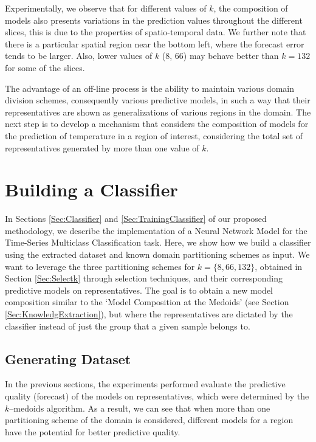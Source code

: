 Experimentally, we observe that for different values of $k$, the composition of models also presents variations in the prediction values throughout the different slices, this is due to the properties of spatio-temporal data. We further note that there is a particular spatial region near the bottom left, where the forecast error tends to be larger. Also, lower values of $k$ (8, 66) may behave better than $k=132$ for some of the slices. 

The advantage of an off-line process is the ability to maintain various domain division schemes, consequently various predictive models, in such a way that their representatives are shown as generalizations of various regions in the domain. The next step is to develop a mechanism that considers the composition of models for the prediction of temperature in a region of interest, considering the total set of representatives generated by more than one value of $k$.

\section{Building a Classifier}
\label{Sec:ExperimentsTrainingClassifier}

In Sections \ref{Sec:Classifier} and \ref{Sec:TrainingClassifier} of our proposed methodology, we describe the implementation of a Neural Network Model for the Time-Series Multiclass Classification task. Here, we show how we build a classifier using the extracted dataset and known domain partitioning schemes as input. We want to leverage the three partitioning schemes for $k = \{8, 66, 132\}$, obtained in Section \ref{Sec:Selectk} through selection techniques, and their corresponding predictive models on representatives. The goal is to obtain a new model composition similar to the `Model Composition at the Medoids' (see Section \ref{Sec:KnowledgExtraction}), but where the representatives are dictated by the classifier instead of just the group that a given sample belongs to. 

\subsection{Generating Dataset}
\label{Sec:ClassifierDataset}

In the previous sections, the experiments performed evaluate the predictive quality (forecast) of the models on representatives, which were determined by the $k$--medoids algorithm. As a result, we can see that when more than one partitioning scheme of the domain is considered, different models for a region have the potential for better predictive quality.

